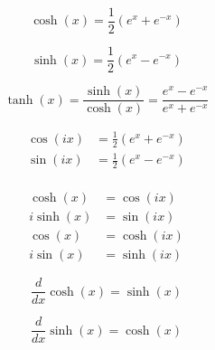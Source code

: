 \begin{equation*}
    \cosh(x) = \frac{1}{2}(e^x + e^{-x})
\end{equation*}

\begin{equation*}
    \sinh(x) = \frac{1}{2}(e^x - e^{-x})
\end{equation*}

\begin{equation*}
    \tanh(x) = \frac{\sinh(x)}{\cosh(x)} = \frac{e^x - e^{-x}}{e^x + e^{-x}}
\end{equation*}

\begin{align*}
    \cos(ix) &= \frac{1}{2}(e^x + e^{-x})\\
    \sin(ix) &= \frac{1}{2}(e^x - e^{-x})\\
\end{align*}

\begin{align*}
    \cosh(x) &= \cos(ix)\\
    i\sinh(x) &= \sin(ix)\\
    \cos(x) &= \cosh(ix)\\
    i\sin(x) &= \sinh(ix)
\end{align*}

\begin{equation*}
    \frac{d}{dx}\cosh(x) = \sinh(x)
\end{equation*}

\begin{equation*}
    \frac{d}{dx}\sinh(x) = \cosh(x)
\end{equation*}